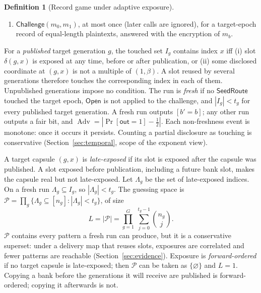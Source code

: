 \documentclass[pdflatex,sn-mathphys-num]{sn-jnl}%
\theoremstyle{plain}
\theoremstyle{definition}
\newtheorem{definition}[theorem]{Definition}
\newcommand{\Adv}{\operatorname{Adv}}
\begin{document}
\begin{definition}[Record game under adaptive exposure]
\begin{enumerate}
\item $\mathsf{Challenge}(m_0,m_1)$, at most once (later calls are ignored), for a target-epoch record of equal-length plaintexts, answered with the encryption of $m_b$.
\end{enumerate}
For a \emph{published} target generation $g$, the touched set $I_g$ contains index $x$ iff (i) slot $\delta(g,x)$ is exposed at any time, before or after publication, or (ii) some disclosed coordinate at $(g,x)$ is not a multiple of $(1,\beta)$. A slot reused by several generations therefore touches the corresponding index in each of them. Unpublished generations impose no condition. The run is \emph{fresh} if no $\mathsf{SeedRoute}$ touched the target epoch, $\mathsf{Open}$ is not applied to the challenge, and $|I_g|<t_g$ for every published target generation. A fresh run outputs $[b'=b]$; any other run outputs a fair bit, and $\Adv=|\Pr[\mathsf{out}=1]-\tfrac12|$. Each non-freshness event is monotone: once it occurs it persists. Counting a partial disclosure as touching is conservative (Section~\ref{sec:temporal}, scope of the exponent view).
\end{definition}

A target capsule $(g,x)$ is \emph{late-exposed} if its slot is exposed after the capsule was published. A slot exposed before publication, including a future bank slot, makes the capsule real but not late-exposed. Let $\Lambda_g$ be the set of late-exposed indices. On a fresh run $\Lambda_g\subseteq I_g$, so $|\Lambda_g|<t_g$. The guessing space is $\mathcal P=\prod_g\{\Lambda_g\subseteq[n_g]:|\Lambda_g|<t_g\}$, of size
\begin{equation}\label{eq:L}
 L=|\mathcal P|=\prod_{g=1}^{G}\ \sum_{j=0}^{t_g-1}\binom{n_g}{j}.
\end{equation}
$\mathcal P$ contains every pattern a fresh run can produce, but it is a conservative superset: under a delivery map that reuses slots, exposures are correlated and fewer patterns are reachable (Section~\ref{sec:evidence}). Exposure is \emph{forward-ordered} if no target capsule is late-exposed; then $\mathcal P$ can be taken as $\{\varnothing\}$ and $L=1$. Copying a bank before the generations it will receive are published is forward-ordered; copying it afterwards is not.
\end{document}
